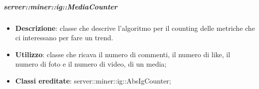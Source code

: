 	\subparagraph{server::miner::ig::MediaCounter} %
		\label{subp:server_miner_ig_MediaCounter}
			\begin{itemize}
				\item \textbf{Descrizione}: classe che descrive l’algoritmo per il counting delle metriche che ci interessano per fare un trend.
				\item \textbf{Utilizzo}: classe che ricava il numero di commenti, il numero di like, il numero di foto e il numero di video, di un media;
				\item \textbf{Classi ereditate}: server::miner::ig::AbsIgCounter;
			\end{itemize}


